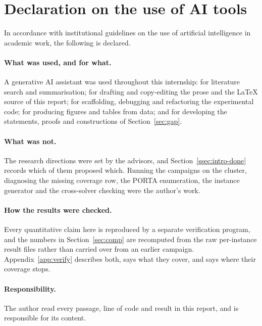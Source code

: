 \section{Declaration on the use of AI tools}\label{sec:ai}

In accordance with institutional guidelines on the use of artificial intelligence in
academic work, the following is declared.

\paragraph{What was used, and for what.}
A generative AI assistant was used throughout this internship: for literature search
and summarisation; for drafting and copy-editing the prose and the \LaTeX{} source of
this report; for scaffolding, debugging and refactoring the experimental code; for
producing figures and tables from data; and for developing the statements, proofs and
constructions of Section~\ref{sec:gap}.

\paragraph{What was not.}
The research directions were set by the advisors, and Section~\ref{ssec:intro-done}
records which of them proposed which. Running the campaigns on the cluster, diagnosing
the missing coverage row, the PORTA enumeration, the instance generator and the
cross-solver checking were the author's work.

\paragraph{How the results were checked.}
Every quantitative claim here is reproduced by a separate verification program, and the
numbers in Section~\ref{sec:comp} are recomputed from the raw per-instance result files
rather than carried over from an earlier campaign. Appendix~\ref{app:verify} describes
both, says what they cover, and says where their coverage stops.

\paragraph{Responsibility.}
The author read every passage, line of code and result in this report, and is
responsible for its content.
